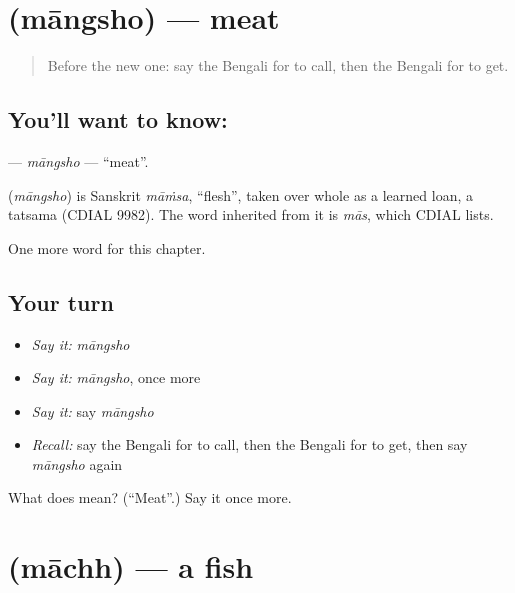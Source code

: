 \section[\texorpdfstring{\bn{মাংস} (māngsho)}{মাংস (māngsho)}]{ (māngsho) — meat}

\label{lesson:BN-C55-mangsho}



\begin{quote}
Before the new one: say the Bengali for to call, then the Bengali for to get.
\end{quote}

\subsection*{You'll want to know: }
\textbf{} — \emph{māngsho} — \textquotedblleft{}meat\textquotedblright{}.

\begin{cousinweb}
\textbf{} (\emph{māngsho}) is Sanskrit \emph{māṁsa}, \textquotedblleft{}flesh\textquotedblright{}, taken over whole as a learned loan, a tatsama (CDIAL 9982). The word inherited from it is \emph{mās}, which CDIAL lists.
\end{cousinweb}

\begin{grammarlens}[title={What you've built}]
One more word for this chapter.
\end{grammarlens}

\subsection*{Your turn}
\begin{itemize}
\raggedright
  \item \emph{Say it:} \emph{māngsho}
  \item \emph{Say it:} \emph{māngsho}, once more
  \item \emph{Say it:} say \emph{māngsho}
  \item \emph{Recall:} say the Bengali for to call, then the Bengali for to get, then say \emph{māngsho} again
\end{itemize}

\begin{tcolorbox}[breakable,colback=teal!4,colframe=teal!35!black,title={Before you move on}]
What does  mean? (\textquotedblleft{}Meat\textquotedblright{}.) Say it once more.
\end{tcolorbox}
\section[\texorpdfstring{\bn{মাছ} (māchh)}{মাছ (māchh)}]{ (māchh) — a fish}

